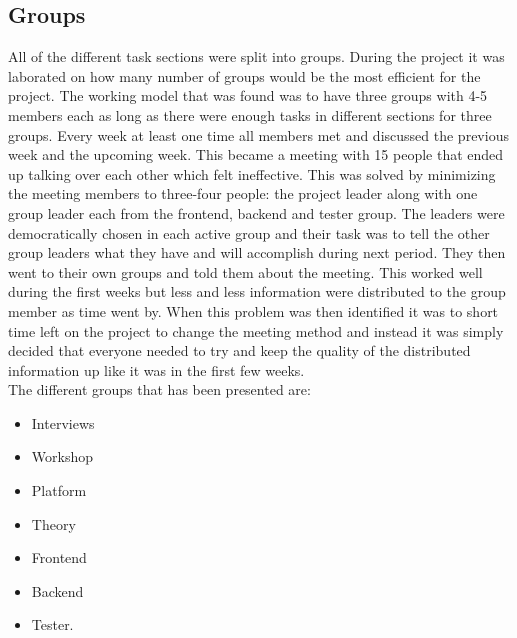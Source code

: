 \subsection{Groups} 
All of the different task sections were split into groups. During the project it was laborated on how many number of groups would be the most efficient for the project. The working model that was found was to have three groups with 4-5 members each as long as there were enough tasks in different sections for three groups. Every week at least one time all members met and discussed the previous week and the upcoming week. This became a meeting with 15 people that ended up talking over each other which felt ineffective. This was solved by minimizing the meeting members to three-four people: the project leader along with one group leader each from the frontend, backend and tester group. The leaders were democratically chosen in each active group and their task was to tell the other group leaders what they have and will accomplish during next period. They then went to their own groups and told them about the meeting. This worked well during the first weeks but less and less information were distributed to the group member as time went by. When this problem was then identified it was to short time left on the project to change the meeting method and instead it was simply decided that everyone needed to try and keep the quality of the distributed information up like it was in the first few weeks. \\
The different groups that has been presented are:\\
 \begin{itemize}
 \item Interviews
 \item Workshop
 \item Platform
 \item Theory
 \item Frontend
 \item Backend
 \item Tester.
 \end{itemize}


